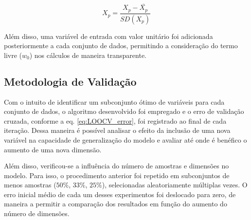 \begin{equation}
    X_p = \frac{ X_p - \bar{X_p} }{SD(X_p)}
    \label{eq:z-score}
\end{equation}

Além disso, uma variável de entrada com valor unitário foi adicionada posteriormente a cada conjunto de dados, 
permitindo a consideração do termo livre ($w_0$) nos cálculos de maneira transparente.

\subsection{Metodologia de Validação}

Com o intuito de identificar um subconjunto ótimo de variáveis para cada conjunto de dados, o algoritmo 
desenvolvido foi empregado e o erro de validação cruzada, conforme a eq. \ref{eq:LOOCV_error}, foi registrado 
ao final de cada iteração. Dessa maneira é possível analisar o efeito da inclusão de uma nova variável na 
capacidade de generalização do modelo e avaliar até onde é benéfico o aumento de uma nova dimensão.

Além disso, verificou-se a influência do número de amostras e dimensões no modelo. Para isso, o procedimento 
anterior foi repetido em subconjuntos de menos amostras ($50\%$, $33\%$, $25\%$), selecionadas aleatoriamente 
múltiplas vezes. O erro inicial médio de cada um desses experimentos foi deslocado para zero, de maneira a 
permitir a comparação dos resultados em função do aumento do número de dimensões.




